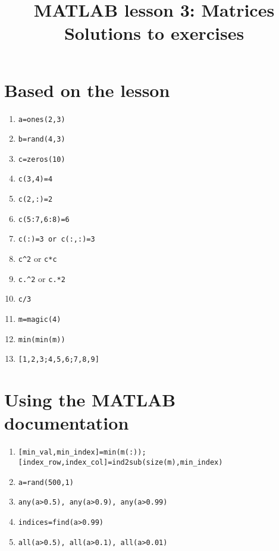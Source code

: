 \documentclass[a4paper]{article}
\title{MATLAB lesson 3: Matrices\\Solutions to exercises}
\date{}
\begin{document}
\maketitle

\section{Based on the lesson}

\begin{enumerate}
	\item \lstinline[style=Matlab-editor]!a=ones(2,3)!
	\item \lstinline[style=Matlab-editor]!b=rand(4,3)!
	\item \lstinline[style=Matlab-editor]!c=zeros(10)!
	\item \lstinline[style=Matlab-editor]!c(3,4)=4!
	\item \lstinline[style=Matlab-editor]!c(2,:)=2!
	\item \lstinline[style=Matlab-editor]!c(5:7,6:8)=6!
	\item \lstinline[style=Matlab-editor]!c(:)=3 or c(:,:)=3!
	\item \lstinline[style=Matlab-editor]!c^2! or \lstinline[style=Matlab-editor]!c*c!
	\item \lstinline[style=Matlab-editor]!c.^2! or \lstinline[style=Matlab-editor]!c.*2!
	\item \lstinline[style=Matlab-editor]!c/3!
	\item \lstinline[style=Matlab-editor]!m=magic(4)!
	\item \lstinline[style=Matlab-editor]!min(min(m))!
	\item \lstinline[style=Matlab-editor]![1,2,3;4,5,6;7,8,9]!
\end{enumerate}

\medskip

\section{Using the MATLAB documentation}

	\begin{enumerate}
			\item \lstinline[style=Matlab-editor]![min_val,min_index]=min(m(:));[index_row,index_col]=ind2sub(size(m),min_index)!
			\item \lstinline[style=Matlab-editor]!a=rand(500,1)!
			\item \lstinline[style=Matlab-editor]!any(a>0.5), any(a>0.9), any(a>0.99)!
			\item \lstinline[style=Matlab-editor]!indices=find(a>0.99)!
			\item \lstinline[style=Matlab-editor]!all(a>0.5), all(a>0.1), all(a>0.01)!
	\end{enumerate}
\end{document}

